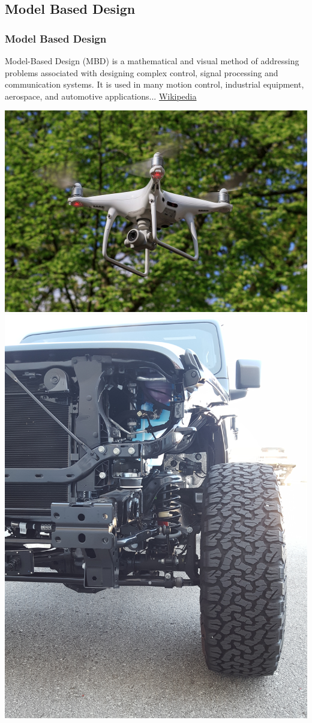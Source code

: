 \documentclass[fleqn]{beamer} %
\newcommand{\sectionIsubsectionIIItitle}{Model Based Design}
\begin{document}
		\subsection{\sectionIsubsectionIIItitle}\label{sectionIsubsectionIII}
			\begin{frame} 
				\frametitle{\sectionIsubsectionIIItitle}
				\bigskip

				Model-Based Design (MBD) is a mathematical and visual method of addressing problems associated with designing complex control, signal processing and communication systems. It is used in many motion control, industrial equipment, aerospace, and automotive applications... \href{https://en.wikipedia.org/wiki/Model-based_design}{\tiny Wikipedia}

				\includegraphics[scale=.08]{images/dji_phantom_fig2.jpg}\hspccc
				\includegraphics[scale=.025,angle=-90,origin=c]{images/jeep_01.jpg} \hspccc

\end{frame}
\end{document}
